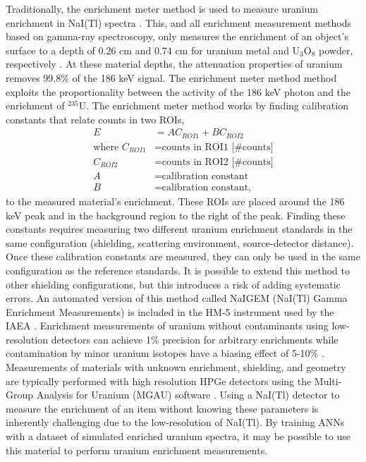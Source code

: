Traditionally, the enrichment meter method is used to measure uranium enrichment in NaI(Tl) spectra \cite{Reilly1970}. This, and all enrichment measurement methods based on gamma-ray spectroscopy, only measures the enrichment of an object's surface to a depth of 0.26 cm and 0.74 cm for uranium metal and U$_{3}$O$_{8}$ powder, respectively \cite{Pandas}. At these material depths, the attenuation properties of uranium removes 99.8\% of the 186 keV signal. The enrichment meter method method exploits the proportionality between the activity of the 186 keV photon and the enrichment of $^{235}$U. The enrichment meter method works by finding calibration constants that relate counts in two ROIs,
%
\begin{align} \label{eq:enrichment_meter_principle}
E &= A  C_{ROI1} + B C_{ROI2} \\
\text{where } C_{ROI1} &= \text{counts in ROI1 [\# counts]} \nonumber \\
C_{ROI2} &= \text{counts in ROI2 [\# counts]} \nonumber \\
A &= \text{calibration constant} \nonumber \\
B &= \text{calibration constant,} \nonumber
\end{align}
%
to the measured material's enrichment. These ROIs are placed around the 186 keV peak and in the background region to the right of the peak. Finding these constants requires measuring two different uranium enrichment standards in the same configuration (shielding, scattering environment, source-detector distance). Once these calibration constants are measured, they can only be used in the same configuration as the reference standards. It is possible to extend this method to other shielding configurations, but this introduces a risk of adding systematic errors. An automated version of this method called NaIGEM (NaI(Tl) Gamma Enrichment Measurements) is included in the HM-5 instrument used by the IAEA \cite{MORTREAU2004}. Enrichment measurements of uranium without contaminants using low-resolution detectors can achieve 1\% precision for arbitrary enrichments while  contamination by minor uranium isotopes have a biasing effect of 5-10\% \cite{SPRINKLE1997}. Measurements of materials with unknown enrichment, shielding, and geometry are typically performed with high resolution HPGe detectors using the Multi-Group Analysis for Uranium (MGAU) software \cite{MGAU1994}. Using a NaI(Tl) detector to measure the enrichment of an item without knowing these parameters is inherently challenging due to the low-resolution of NaI(Tl). By training ANNs with a dataset of simulated enriched uranium spectra, it may be possible to use this material to perform uranium enrichment measurements.


